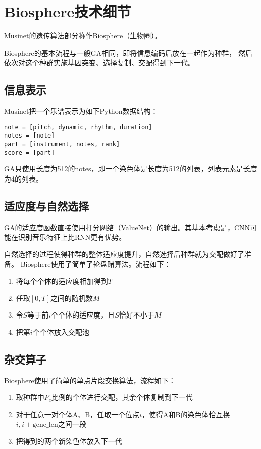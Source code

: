 \documentclass{ctexart}
\begin{document}
\fi

\section{Biosphere技术细节}
Musinet的遗传算法部分称作Biosphere（生物圈）。

Biosphere的基本流程与一般GA相同，即将信息编码后放在一起作为种群，
然后依次对这个种群实施基因突变、选择复制、交配得到下一代。

\subsection{信息表示}
Musinet把一个乐谱表示为如下Python数据结构：
\begin{lstlisting}
note = [pitch, dynamic, rhythm, duration]
notes = [note]
part = [instrument, notes, rank]
score = [part]
\end{lstlisting}
GA只使用长度为512的notes，即一个染色体是长度为512的列表，列表元素是长度为4的列表。

\subsection{适应度与自然选择}
GA的适应度函数直接使用打分网络（ValueNet）的输出。其基本考虑是，CNN可能在识别音乐特征上比RNN更有优势。

自然选择的过程使得种群的整体适应度提升，自然选择后种群就为交配做好了准备。
Biosphere使用了简单了轮盘赌算法。流程如下：
\begin{enumerate}[nosep]
  \item 将每个个体的适应度相加得到$T$
  \item 任取$[0,T]$之间的随机数$M$
  \item 令$S$等于前$i$个个体的适应度，且$S$恰好不小于$M$
  \item 把第$i$个个体放入交配池
\end{enumerate}

\subsection{杂交算子}
Biosphere使用了简单的单点片段交换算法，流程如下：
\begin{enumerate}[nosep]
  \item 取种群中$P_c$比例的个体进行交配，其余个体复制到下一代
  \item 对于任意一对个体A、B，任取一个位点$i$，使得A和B的染色体恰互换$i,i+\mathrm{gene\_len}$之间一段
  \item 把得到的两个新染色体放入下一代
\end{enumerate}
\end{document}
